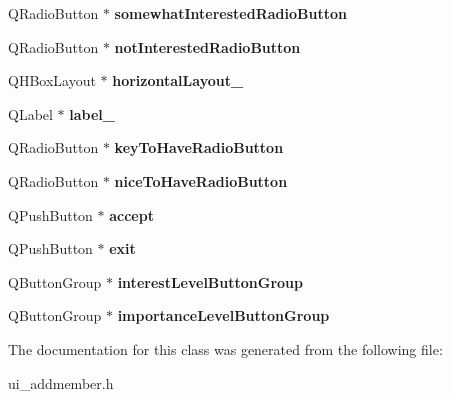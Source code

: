 \begin{DoxyCompactItemize}
\item 
\mbox{\label{class_ui__addmember_a249508dc28fdb0aceb8eb1e5dc368a86}} 
Q\+Radio\+Button $\ast$ {\bfseries somewhat\+Interested\+Radio\+Button}
\item 
\mbox{\label{class_ui__addmember_a2cd2d4d5b95ef1bf632bb39854183bbe}} 
Q\+Radio\+Button $\ast$ {\bfseries not\+Interested\+Radio\+Button}
\item 
\mbox{\label{class_ui__addmember_a256ef3ea11e831ef68c12c663a256ea9}} 
Q\+H\+Box\+Layout $\ast$ {\bfseries horizontal\+Layout\+\_}
\item 
\mbox{\label{class_ui__addmember_adea8509de21722a75b221b2eceb7124b}} 
Q\+Label $\ast$ {\bfseries label\+\_}
\item 
\mbox{\label{class_ui__addmember_a9d890158ef1ad56792519c7bceb344dc}} 
Q\+Radio\+Button $\ast$ {\bfseries key\+To\+Have\+Radio\+Button}
\item 
\mbox{\label{class_ui__addmember_a7a51218b44f14e9dafa551da9247b194}} 
Q\+Radio\+Button $\ast$ {\bfseries nice\+To\+Have\+Radio\+Button}
\item 
\mbox{\label{class_ui__addmember_a5a5158d0873a4984f31dd910738a586b}} 
Q\+Push\+Button $\ast$ {\bfseries accept}
\item 
\mbox{\label{class_ui__addmember_af608656afee4cc471258df44c2f1c973}} 
Q\+Push\+Button $\ast$ {\bfseries exit}
\item 
\mbox{\label{class_ui__addmember_a94cd85db97bd5f36f9aae216fccd3c6d}} 
Q\+Button\+Group $\ast$ {\bfseries interest\+Level\+Button\+Group}
\item 
\mbox{\label{class_ui__addmember_a7c8e18660823c21b714ab9c0d004b387}} 
Q\+Button\+Group $\ast$ {\bfseries importance\+Level\+Button\+Group}
\end{DoxyCompactItemize}


The documentation for this class was generated from the following file\+:\begin{DoxyCompactItemize}
\item 
ui\+\_\+addmember.\+h\end{DoxyCompactItemize}
